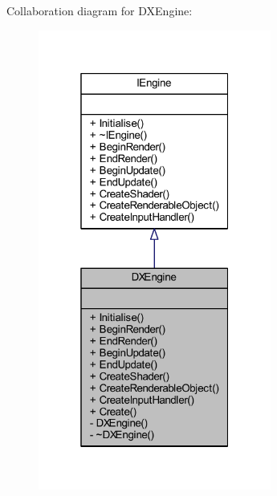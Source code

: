 Collaboration diagram for D\+X\+Engine\+:\nopagebreak
\begin{figure}[H]
\begin{center}
\leavevmode
\includegraphics[width=217pt]{class_d_x_engine__coll__graph}
\end{center}
\end{figure}
